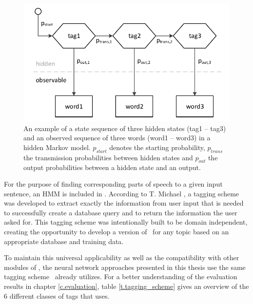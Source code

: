 \vspace{1em}
\begin{figure}[H]
	\includegraphics[width=\textwidth]{images/hmm_structure}
	\vspace{.8em}
	\caption[Structure of a Hidden Markov Model]{An example of a state sequence of three hidden states (tag1 -- tag3) and an observed sequence of three words (word1 -- word3) in a hidden Markov model. $p_{start}$ denotes the starting probability, $p_{trans}$ the transmission probabilities between hidden states and $p_{out}$ the output probabilities between a hidden state and an output.}
	\label{f.hmm_structure}
	\vspace{.8em}
\end{figure}

For the purpose of finding corresponding parts of speech to a given input sentence, an HMM is included in \Alex. According to T. Michael \cite{michael2016}, a tagging scheme was developed to extract exactly the information from user input that is needed to successfully create a database query and to return the information the user asked for. This tagging scheme was intentionally built to be domain independent, creating the opportunity to develop a version of \Alex\ for any topic based on an appropriate database and training data.

To maintain this universal applicability as well as the compatibility with other modules of \Alex, the neural network approaches presented in this thesis use the same tagging scheme \Alex\ already utilizes. For a better understanding of the evaluation results in chapter \ref{c.evaluation}, table \ref{t.tagging_scheme} gives an overview of the 6 different classes of tags that \Alex uses.

